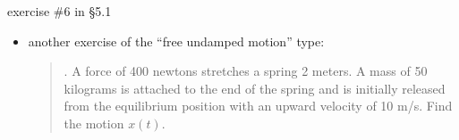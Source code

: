 \documentclass[urlcolor=blue]{beamer}
\begin{document}
\begin{frame}{exercise \#6 in \S5.1}

\begin{itemize}
\item another exercise of the ``free undamped motion'' type:

\begin{quotation}
. A force of 400 newtons stretches a spring 2 meters.  A mass of 50 kilograms is attached to the end of the spring and is initially released from the equilibrium position with an upward velocity of 10 m/s.  Find the motion $x(t)$.
\end{quotation}
\end{itemize}

\vspace{40mm}
\end{frame}
\end{document}

